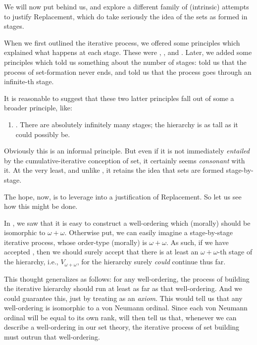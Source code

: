 \documentclass[../../../include/open-logic-section]{subfiles}
\begin{document}

We will now put \limofsize{} behind us, and explore a different
family of (intrinsic) attempts to justify Replacement, which do take
seriously the idea of the sets as formed in stages.

When we first outlined the iterative process, we offered some
principles which explained what happens at each stage. These were
\stageshier, \stagesord, and \stagesacc. Later, we added some
principles which told us something about the number of stages:
\stagessucc{} told us that the process of set-formation never ends,
and \stagesinf{} told us that the process goes through an infinite-th
stage. 

It is reasonable to suggest that these two latter principles fall out
of some a broader principle, like:
\begin{enumerate}
	\item[] \stagesinex. There are absolutely infinitely many stages;
	the hierarchy is as tall as it could possibly be.
\end{enumerate}
Obviously this is an informal principle. But even if it is not
immediately \emph{entailed} by the cumulative-iterative conception of
set, it certainly seems \emph{consonant} with it. At the very least,
and unlike \limofsize, it retains the idea that sets are formed
stage-by-stage. 

The hope, now, is to leverage \stagesinex{} into a justification of
Replacement. So let us see how this might be done. 

In , we saw that it is easy to
construct a well-ordering which (morally) should be isomorphic to
$\omega+\omega$. Otherwise put, we can easily imagine a stage-by-stage
iterative process, whose order-type (morally) is $\omega+\omega$. As
such, if we have accepted \stagesinex, then we should surely accept
that there is at least an $\omega+\omega$-th stage of the hierarchy,
i.e., $V_{\omega+\omega}$, for the hierarchy surely \emph{could}
continue thus far. 

This thought generalizes as follows: for any well-ordering, the
process of building the iterative hierarchy should run at least as far
as that well-ordering. And we could guarantee this, just by treating
 as an
\emph{axiom}. This would tell us that any well-ordering is isomorphic
to a von Neumann ordinal. Since each von Neumann ordinal will be equal
to its own rank, 
will then tell us that, whenever we can describe a well-ordering in
our set theory, the iterative process of set building must outrun that
well-ordering. 
\end{document}
